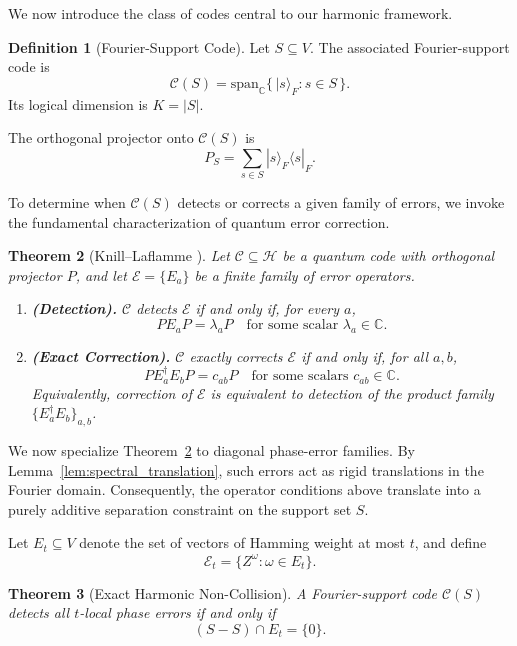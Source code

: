 \documentclass[a4paper,twocolumn,11pt,allowtoday]{quantumarticle}
\theoremstyle{plain}
\newtheorem{theorem}{Theorem}[section]
\theoremstyle{definition}
\newtheorem{definition}[theorem]{Definition}
\theoremstyle{remark}
\begin{document}
We now introduce the class of codes central to our harmonic framework.

\begin{definition}[Fourier-Support Code]
Let $S\subseteq V$. The associated Fourier-support code is
\[
\mathcal{C}(S)
=
\mathrm{span}_{\mathbb{C}}
\{\,|s\rangle_F : s\in S\,\}.
\]
Its logical dimension is $K=|S|$.
\end{definition}

The orthogonal projector onto $\mathcal{C}(S)$ is
\[
P_S=\sum_{s\in S}|s\rangle_F\langle s|_F.
\]

To determine when $\mathcal{C}(S)$ detects or corrects a given family of errors,
we invoke the fundamental characterization of quantum error correction.

\begin{theorem}[Knill--Laflamme {\cite{KnillLaflamme1997}}]
\label{thm:KL}
Let $\mathcal{C}\subseteq\mathcal{H}$ be a quantum code with orthogonal projector $P$,
and let $\mathcal{E}=\{E_a\}$ be a finite family of error operators.

\begin{enumerate}
\item \textbf{(Detection).}
$\mathcal{C}$ detects $\mathcal{E}$ if and only if, for every $a$,
\[
P E_a P = \lambda_a P
\quad\text{for some scalar } \lambda_a\in\mathbb{C}.
\]

\item \textbf{(Exact Correction).}
$\mathcal{C}$ exactly corrects $\mathcal{E}$ if and only if, for all $a,b$,
\[
P E_a^\dagger E_b P = c_{ab} P
\quad\text{for some scalars } c_{ab}\in\mathbb{C}.
\]
Equivalently, correction of $\mathcal{E}$ is equivalent to detection of the product family
$\{E_a^\dagger E_b\}_{a,b}$.
\end{enumerate}
\end{theorem}

We now specialize Theorem~\ref{thm:KL} to diagonal phase-error families.
By Lemma~\ref{lem:spectral_translation}, such errors act as rigid translations
in the Fourier domain. Consequently, the operator conditions above
translate into a purely additive separation constraint
on the support set $S$.

Let $E_t\subseteq V$ denote the set of vectors of Hamming weight at most $t$, and define
\[
\mathcal{E}_t=\{Z^\omega:\omega\in E_t\}.
\]
\begin{theorem}[Exact Harmonic Non-Collision]
\label{thm:main_detection}
A Fourier-support code $\mathcal{C}(S)$ detects all $t$-local phase errors if and only if
\[
(S-S)\cap E_t=\{0\}.
\]
\end{theorem}
\end{document}
